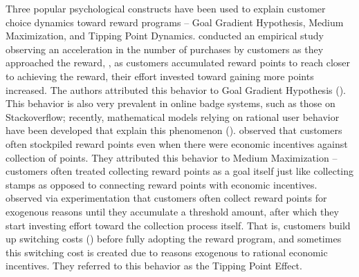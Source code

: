 Three popular psychological constructs have been used to explain customer choice dynamics toward reward programs -- Goal Gradient Hypothesis, Medium Maximization, and Tipping Point Dynamics.
\cite{kivetz2006goal} conducted an empirical study observing an acceleration in the number of purchases by customers as they approached the reward, \ie, as customers accumulated reward points to reach closer to achieving the reward, their effort invested toward gaining more points increased. 
The authors attributed this behavior to Goal Gradient Hypothesis (\cite{hull1932goal}). 
This behavior is also very prevalent in online badge systems, such as those on Stackoverflow; recently, mathematical models relying on rational user behavior have been developed that explain this phenomenon (\cite{leskovec2013steering}).
\cite{stourm2015stockpiling, dreze2004using} observed that customers often stockpiled reward points even when there were economic incentives against collection of points. They attributed this behavior to Medium Maximization -- customers often treated collecting reward points as a goal itself just like collecting stamps as opposed to connecting reward points with economic incentives.
\cite{gao2014influence} observed via experimentation that customers often collect reward points for exogenous reasons until they accumulate a threshold amount, after which they start investing effort toward the collection process itself.
That is, customers build up switching costs (\cite{klemperer1995competition}) before fully adopting the reward program, and sometimes this switching cost is created due to reasons exogenous to rational economic incentives.
They referred to this behavior as the Tipping Point Effect.

